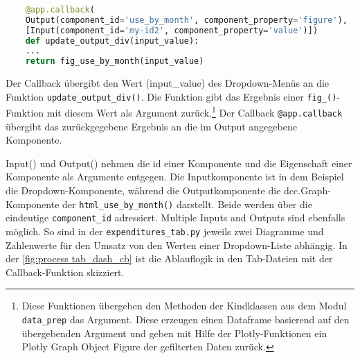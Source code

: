     \begin{lstlisting}[language=Python, caption={html\_fig\_total\_expnd()}]        
    
    @app.callback(
    Output(component_id='use_by_month', component_property='figure'),
    [Input(component_id='my-id2', component_property='value')])
    def update_output_div(input_value):
    ...
    return fig_use_by_month(input_value)
    \end{lstlisting}


 
    Der Callback übergibt den Wert (input\_value) des Dropdown-Menüs an die Funktion \texttt{update\_output\_div()}. 
    Die Funktion gibt das Ergebnis einer \texttt{fig\_()}-Funktion mit diesem Wert als Argument zurück.\footnote{Diese Funktionen übergeben den Methoden der Kindklassen aus dem Modul \texttt{data\_prep} das Argument. 
    Diese erzeugen einen Dataframe basierend auf den übergebenden Argument und geben mit Hilfe der Plotly-Funktionen ein Plotly Graph Object Figure der gefilterten Daten zurück.}
    Der Callback \texttt{@app.callback} übergibt das zurückgegebene Ergebnis an die im Output angegebene Komponente.
    
    Input() und Output() nehmen die id einer Komponente und die Eigenschaft einer Komponente als Argumente entgegen.
    Die Inputkomponente ist in dem Beispiel die Dropdown-Komponente, während die Outputkomponente die dcc.Graph-Komponente der
    \texttt{html\_use\_by\_month()} darstellt. Beide werden über die eindeutige \texttt{component\_id} adressiert.
    Multiple Inputs and Outputs sind ebenfalls möglich. So sind in der \texttt{expenditures\_tab.py}
    jeweils zwei Diagramme und Zahlenwerte für den Umsatz von den Werten einer Dropdown-Liste abhängig.
    In der \autoref{fig:process tab_dash_cb} ist die Ablauflogik in den Tab-Dateien mit der Callback-Funktion skizziert.

